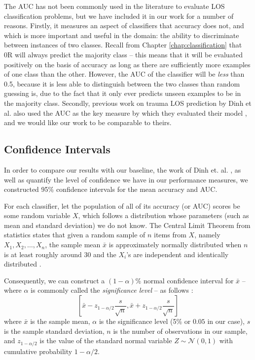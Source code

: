 The AUC has not been commonly used in the literature to evaluate LOS
classification problems, but we have included it in our work for a number of
reasons. Firstly, it measures an aspect of classifiers that accuracy does not,
and which is more important and useful in the domain: the ability to
discriminate between instances of two classes. Recall from Chapter
\ref{chap:classification} that 0R will always predict the majority class --
this means that it will be evaluated positively on the basis of accuracy
as long as there are sufficiently more examples of one class than the other.
However, the AUC of the classifier will be \textit{less} than 0.5, because it
is less able to distinguish between the two classes than random guessing is,
due to the fact that it only ever predicts unseen examples to be in the
majority class. Secondly, previous work on trauma LOS prediction by Dinh et al.
also used the AUC as the key measure by which they evaluated their model
\cite{Dinh2013a}, and we would like our work to be comparable to theirs.

\subsection{Confidence Intervals}
In order to compare our results with our baseline, the work of Dinh et. al.
\citep{Dinh2013a}, as well as quantify the level of confidence we have in
our performance measures, we constructed 95\% confidence intervals for the
mean accuracy and AUC.

For each classifier, let the population of all of its accuracy (or AUC)
scores be some random variable $X$, which follows a distribution whose
parameters (such as mean and standard deviation) we do not know.
The Central Limit Theorem from statistics states that given a random
sample of $n$ items from $X$, namely $X_1,X_2,\dots,X_n$, the sample mean
$\bar{x}$
is approximately normally distributed when $n$ is at least roughly around 30
and the $X_i$'s are independent and identically distributed \cite{Phipps2001}.

Consequently, we can construct a $(1-\alpha)$\% normal confidence interval for
$\bar{x}$ -- where $\alpha$ is commonly called the
\textit{significance level} -- as follows \cite{Wasserman2003}:
\begin{equation*}
  \left[\bar{x} - z_{1-\alpha/2}\dfrac{s}{\sqrt{n}},
    \bar{x} + z_{1-\alpha/2}\dfrac{s}{\sqrt{n}}\right]
\end{equation*}
where $\bar{x}$ is the sample mean, $\alpha$ is the significance level
(5\% or $0.05$ in our case), $s$ is the sample standard deviation, $n$
is the number of observations in our sample, and $z_{1-\alpha/2}$ is the value
of the standard normal variable $Z \sim \mathcal{N}(0,1)$ with cumulative
probability $1-\alpha/2$.

